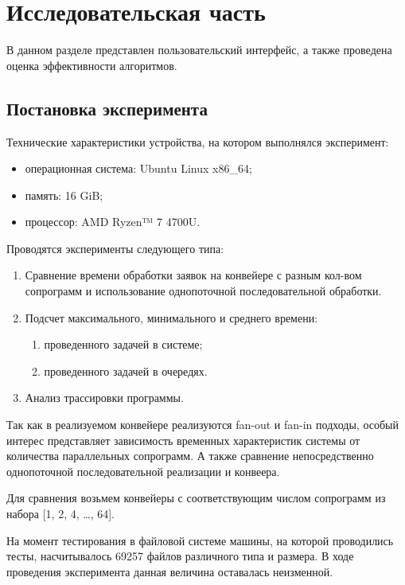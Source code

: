 \chapter{Исследовательская часть}

В данном разделе представлен пользовательский интерфейс, а
также проведена оценка эффективности алгоритмов.


\section{Постановка эксперимента}

Технические характеристики устройства, на котором выполнялся эксперимент:
\begin{itemize}
	\item операционная система: Ubuntu\cite{ubuntu} Linux x86\_64;
	\item память: 16 GiB;
	\item процессор: AMD Ryzen™ 7 4700U\cite{amd}.
\end{itemize}

Проводятся эксперименты следующего типа:
\begin{enumerate}
	\item Сравнение времени обработки заявок на конвейере с разным 
	кол-вом сопрограмм и использование однопоточной последовательной обработки.
	\item Подсчет максимального, минимального и среднего времени:
	\begin{enumerate}
		\item проведенного задачей в системе;
		\item проведенного задачей в очередях.
	\end{enumerate}
	\item Анализ трассировки программы.
\end{enumerate}


Так как в реализуемом конвейере реализуются fan-out и fan-in подходы, особый интерес представляет 
зависимость временных характеристик системы от количества параллельных сопрограмм. А также 
сравнение непосредственно однопоточной последовательной реализации и конвеера.

Для сравнения возьмем конвейеры с соответствующим числом сопрограмм из набора [1, 2, 4, …, 64].

На момент тестирования в файловой системе машины, на которой проводились тесты,
насчитывалось 69257 файлов различного типа и размера. В ходе проведения эксперимента 
данная величина оставалась неизменной.

